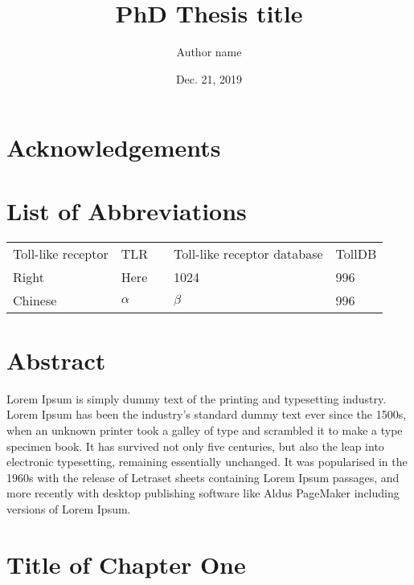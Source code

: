 \documentclass[a4paper,12pt,UTF8,openright]{book}
\title{\Huge \bfseries PhD Thesis title}
\author{Author name}
\date{Dec. 21, 2019}
\begin{document}
\begin{titlepage}
\maketitle
\thispagestyle{empty}
\end{titlepage}

\tableofcontents
\thispagestyle{empty}

\newpage
\thispagestyle{empty}

\frontmatter
\chapter*{Acknowledgements}
\lipsum[1-5]

\chapter*{List of Abbreviations}

\begin{tabular}{p{}p{}||p{}p{}p{}}
	Toll-like receptor & TLR & &Toll-like receptor database & TollDB \\
	Right    & Here      & & 1024 & 996 \\
	Chinese  & $\alpha$  & & $\beta$  & 996 \\
\end{tabular}


\chapter*{Abstract}

Lorem Ipsum is simply dummy text of the printing and typesetting industry. Lorem Ipsum has been the industry's standard dummy text ever since the 1500s, when an unknown printer took a galley of type and scrambled it to make a type specimen book. It has survived not only five centuries, but also the leap into electronic typesetting, remaining essentially unchanged. It was popularised in the 1960s with the release of Letraset sheets containing Lorem Ipsum passages, and more recently with desktop publishing software like Aldus PageMaker including versions of Lorem Ipsum.~\cite{Weir04}

\mainmatter
\chapter{Title of Chapter One}
\end{document}
